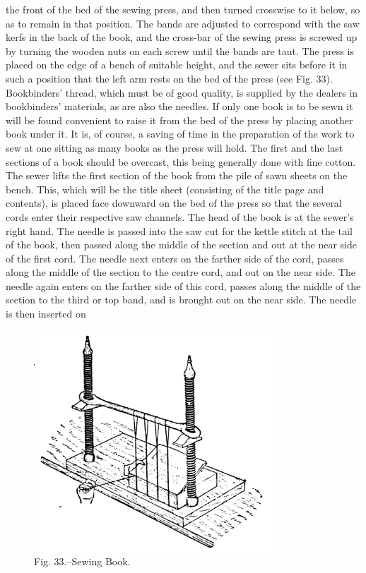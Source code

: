 \documentclass[twoside]{book}
\begin{document}
the front of the bed of the sewing press, and then
turned crosswise to it below, so as to remain in that
position. The bands are adjusted to correspond
with the saw kerfs in the back of the book, and the
cross-bar of the sewing press is screwed up by turning
the wooden nuts on each screw until the bands
are taut. The press is placed on the edge of a
bench of suitable height, and the sewer sits before
it in such a position that the left arm rests on the
bed of the press (see Fig. 33). Bookbinders' thread,
which must be of good quality, is supplied by the
dealers in bookbinders' materials, as are also the
needles. If only one book is to be sewn it will be
found convenient to raise it from the bed of the
press by placing another book under it. It is, of
course, a saving of time in the preparation of the
work to sew at one sitting as many books as the
press will hold. The first and the last sections of
a book should be overcast, this being generally done
with fine cotton. The sewer lifts the first section
of the book from the pile of sawn sheets on the
bench. This, which will be the title sheet (consisting
of the title page and contents), is placed
face downward on the bed of the press so that
the several cords enter their respective saw channels.
The head of the book is at the sewer's right
hand. The needle is passed into the saw cut for
\pagebreak
the kettle stitch at the tail of the book, then passed
along the middle of the section and out at the near
side of the first cord. The needle next enters on
the farther side of the cord, passes along the middle
of the section to the centre cord, and out on the
near side. The needle again enters on the farther
side of this cord, passes along the middle of the
section to the third or top band, and is brought out
on the near side. The needle is then inserted on
	\begin{figure}[h]
		\centering
		\includegraphics[width=0.8\textwidth]{Figures/_033.png}
		\caption*{Fig. 33.--Sewing Book.}
	\end{figure}
\end{document}
